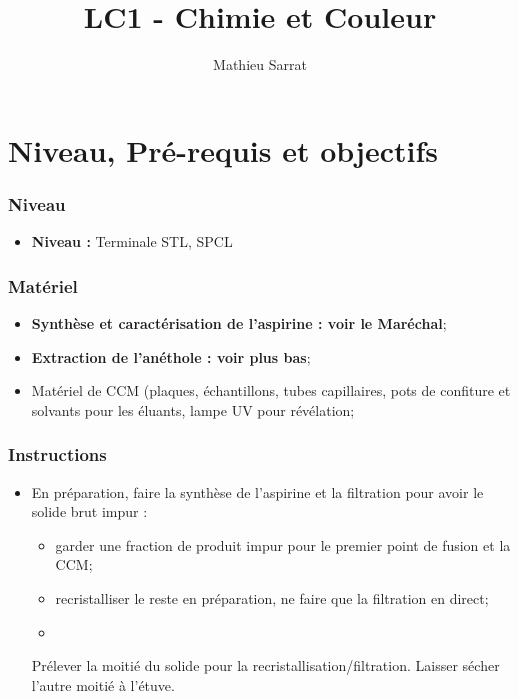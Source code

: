 \documentclass[11pt,a4paper]{report}
\author{Mathieu Sarrat}
\title{LC1 - Chimie et Couleur}
\begin{document}
\maketitle

\section*{Niveau, Pré-requis et objectifs}

\subsubsection*{Niveau}
\begin{itemize}
	\item \textbf{Niveau :} Terminale STL, SPCL\\
\end{itemize}

\subsubsection*{Matériel}
\begin{itemize}
	\item \textbf{Synthèse et caractérisation de l'aspirine : voir le Maréchal};
	\item \textbf{Extraction de l'anéthole : voir plus bas};
	\item Matériel de CCM (plaques, échantillons, tubes capillaires, pots de confiture et solvants pour 		les éluants, lampe UV pour révélation;
\end{itemize}

\subsubsection*{Instructions}
\begin{itemize}
	\item En préparation, faire la synthèse de l'aspirine et la filtration pour avoir le solide brut 		impur :
		\begin{itemize}
			\item garder une fraction de produit impur pour le premier point de fusion et la CCM;
			\item recristalliser le reste en préparation, ne faire que la filtration en direct;
			\item 
		\end{itemize}
Prélever la moitié du solide pour la recristallisation/filtration. Laisser sécher l'autre moitié à l'étuve. 
\end{itemize}
\end{document}
